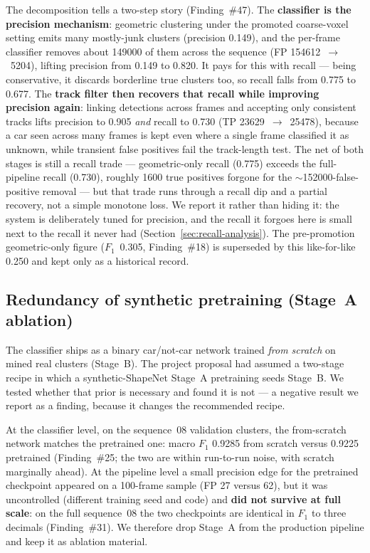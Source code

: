 The decomposition tells a two-step story (Finding~\#47). The \textbf{classifier
is the precision mechanism}: geometric clustering under the promoted coarse-voxel
setting emits many mostly-junk clusters (precision \num{0.149}), and the per-frame
classifier removes about \num{149000} of them across the sequence
(FP \num{154612}~$\rightarrow$~\num{5204}), lifting precision from \num{0.149} to
\num{0.820}. It pays for this with recall --- being conservative, it discards
borderline true clusters too, so recall falls from \num{0.775} to \num{0.677}.
The \textbf{track filter then recovers that recall while improving precision
again}: linking detections across frames and accepting only consistent tracks
lifts precision to \num{0.905} \emph{and} recall to \num{0.730} (TP
\num{23629}~$\rightarrow$~\num{25478}), because a car seen across many frames is
kept even where a single frame classified it as unknown, while transient
false positives fail the track-length test. The net of both stages is still a
recall trade --- geometric-only recall (\num{0.775}) exceeds the full-pipeline
recall (\num{0.730}), roughly \num{1600} true positives forgone for the
$\sim$\num{152000}-false-positive removal --- but that trade runs through a
recall dip and a partial recovery, not a simple monotone loss. We report it
rather than hiding it: the system is deliberately tuned for precision, and the
recall it forgoes here is small next to the recall it never had (Section~\ref{sec:recall-analysis}). The
pre-promotion geometric-only figure ($F_1$~\num{0.305}, Finding~\#18) is
superseded by this like-for-like \num{0.250} and kept only as a historical
record.

\subsection{Redundancy of synthetic pretraining (Stage~A ablation)}
\label{sec:ablation-stagea}

The classifier ships as a binary car/not-car network trained \emph{from scratch}
on mined real clusters (Stage~B). The project proposal had assumed a two-stage
recipe in which a synthetic-ShapeNet Stage~A pretraining seeds Stage~B. We tested
whether that prior is necessary and found it is not --- a negative result we
report as a finding, because it changes the recommended recipe.

At the classifier level, on the sequence~08 validation clusters, the from-scratch
network matches the pretrained one: macro $F_1$ \num{0.9285} from scratch versus
\num{0.9225} pretrained (Finding~\#25; the two are within run-to-run noise, with
scratch marginally ahead). At the pipeline level a small precision edge for the
pretrained checkpoint appeared on a 100-frame sample (FP \num{27} versus
\num{62}), but it was uncontrolled (different training seed and code) and
\textbf{did not survive at full scale}: on the full sequence~08 the two
checkpoints are identical in $F_1$ to three decimals (Finding~\#31). We therefore
drop Stage~A from the production pipeline and keep it as ablation material.

